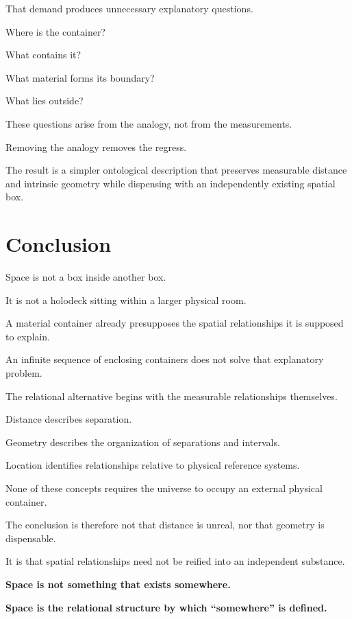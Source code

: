 \documentclass[12pt,onecolumn]{article}
\begin{document}
That demand produces
unnecessary explanatory
questions.

Where is the container?

What contains it?

What material forms its
boundary?

What lies outside?

These questions arise
from the analogy, not
from the measurements.

Removing the analogy
removes the regress.

The result is a simpler
ontological description
that preserves measurable
distance and intrinsic
geometry while dispensing
with an independently
existing spatial box.

\section{Conclusion}

Space is not a box
inside another box.

It is not a holodeck
sitting within a larger
physical room.

A material container
already presupposes the
spatial relationships
it is supposed to explain.

An infinite sequence
of enclosing containers
does not solve that
explanatory problem.

The relational alternative
begins with the measurable
relationships themselves.

Distance describes
separation.

Geometry describes
the organization of
separations and intervals.

Location identifies
relationships relative
to physical reference
systems.

None of these concepts
requires the universe
to occupy an external
physical container.

The conclusion is
therefore not that
distance is unreal,
nor that geometry
is dispensable.

It is that spatial
relationships need not
be reified into an
independent substance.

\begin{center}
\large
\textbf{
Space is not something
that exists somewhere.
}
\end{center}

\begin{center}
\large
\textbf{
Space is the relational
structure by which
``somewhere'' is defined.
}
\end{center}
\end{document}
